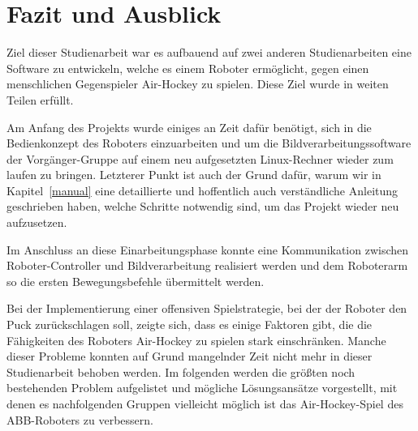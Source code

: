 
\chapter{Fazit und Ausblick}

Ziel dieser Studienarbeit war es aufbauend auf zwei anderen Studienarbeiten eine Software zu entwickeln, welche es einem Roboter ermöglicht, gegen einen menschlichen Gegenspieler Air-Hockey zu spielen. Diese Ziel wurde in weiten Teilen erfüllt. 

Am Anfang des Projekts wurde einiges an Zeit dafür benötigt, sich in die Bedienkonzept des Roboters einzuarbeiten und um die Bildverarbeitungssoftware der Vorgänger-Gruppe auf einem neu aufgesetzten Linux-Rechner wieder zum laufen zu bringen. Letzterer Punkt ist auch der Grund dafür, warum wir in Kapitel~\ref{manual} eine detaillierte und hoffentlich auch verständliche Anleitung geschrieben haben, welche Schritte notwendig sind, um das Projekt wieder neu aufzusetzen. 

Im Anschluss an diese Einarbeitungsphase konnte eine Kommunikation zwischen Roboter-Controller und Bildverarbeitung realisiert werden und dem Roboterarm so die ersten Bewegungsbefehle übermittelt werden. 

Bei der Implementierung einer offensiven Spielstrategie, bei der der Roboter den Puck zurückschlagen soll, zeigte sich, dass es einige Faktoren gibt, die die Fähigkeiten des Roboters Air-Hockey zu spielen stark einschränken. Manche dieser Probleme konnten auf Grund mangelnder Zeit nicht mehr in dieser Studienarbeit behoben werden. Im folgenden werden die größten noch bestehenden Problem aufgelistet und mögliche Lösungsansätze vorgestellt, mit denen es nachfolgenden Gruppen vielleicht möglich ist das Air-Hockey-Spiel des ABB-Roboters zu verbessern.

